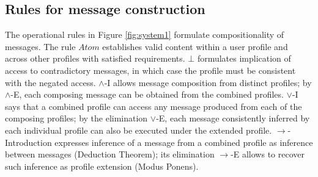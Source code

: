\documentclass[compsoc, conference, letterpaper, 10pt, times]{IEEEtran}
\begin{document}
\subsection{Rules for message construction}

The operational rules in Figure \ref{fig:system1} formulate compositionality of messages. The rule $Atom$ establishes valid content within a user profile and across other profiles with satisfied requirements. $\bot$ formulates implication of access to contradictory messages, in which case the profile must be consistent with the negated access. $\wedge$-I allows message composition from distinct profiles; by $\wedge$-E, each composing message can be obtained from the combined profiles. $\vee$-I says that a combined profile can access any message produced from each of the composing profiles; by the elimination $\vee$-E, each message consistently inferred by each individual profile can also be executed under the extended profile. $\rightarrow$-Introduction expresses inference of a message from a combined profile as inference between messages (Deduction Theorem); its elimination $\rightarrow$-E allows to recover such inference as profile extension (Modus Ponens).
\end{document}
